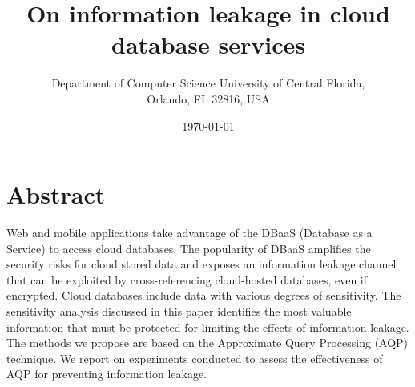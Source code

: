 \documentclass[12pt]{article}
\begin{document}

\title{On information leakage in cloud database services}
\author{Department of Computer Science University of Central Florida,\\ Orlando, FL 32816, USA}
\date{\today}
\maketitle

\tableofcontents

\section*{Abstract}
Web and mobile applications take advantage of the DBaaS (Database as a Service) to access cloud databases. The popularity of DBaaS amplifies the security risks for cloud stored data and exposes an information leakage channel that can be exploited by cross-referencing cloud-hosted databases, even if encrypted. Cloud databases include data with various degrees of sensitivity. The sensitivity analysis discussed in this paper identifies the most valuable information that must be protected for limiting the effects of information leakage. The methods we propose are based on the Approximate Query Processing (AQP) technique.  We report on experiments conducted to assess the effectiveness of AQP for preventing information leakage.
 










\begin{appendices}



\end{appendices}



 
\end{document}
